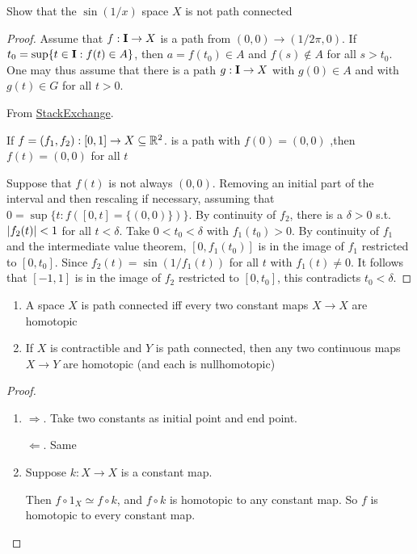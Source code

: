 \documentclass[11pt]{article}
\begin{document}
\begin{exercise}
\label{ex1.15}
Show that the \(\sin(1/x)\) space \(X\) is not path connected
\end{exercise}

\begin{proof}
Assume that \(f:\operatorname{\textbf{I}}\to X\) is a path from \((0,0)\to(1/2\pi,0)\). If \(t_0=\sup\{t\in\operatorname{\textbf{I}}:f(t)\in A\}\),
then \(a=f(t_0)\in A\) and \(f(s)\not\in A\) for all \(s>t_0\). One may thus assume that there is a
path \(g:\operatorname{\textbf{I}}\to X\) with \(g(0)\in A\) and with \(g(t)\in G\) for all \(t>0\).

From \href{https://math.stackexchange.com/questions/35054/topologists-sine-curve-is-not-path-connected}{StackExchange}.

If \(f=(f_1,f_2):[0,1]\to X\subseteq\mathbb{R}^2\).  is a path with \(f(0)=(0,0)\) ,then \(f(t)=(0,0)\) for all \(t\)

Suppose that \(f(t)\) is not always \((0,0)\). Removing an initial part of the interval and then
rescaling if necessary, assuming that \(0=\sup\{t:f([0,t]=\{(0,0)\})\}\). By continuity of \(f_2\),
there is a \(\delta>0\) s.t. \(\abs{f_2(t)}<1\) for all \(t<\delta\). Take \(0<t_0<\delta\) with \(f_1(t_0)>0\).
By continuity of \(f_1\) and the intermediate value theorem, \([0,f_1(t_0)]\) is in the image
of \(f_1\) restricted to \([0,t_0]\). Since \(f_2(t)=\sin(1/f_1(t))\) for all \(t\)
with \(f_1(t)\neq 0\). It follows that \([-1,1]\) is in the image of \(f_2\) restricted
to \([0,t_0]\), this contradicts \(t_0<\delta\).
\end{proof}

\begin{exercise}
\label{ex1.19}
\begin{enumerate}
\item A space \(X\) is path connected iff every two constant maps \(X\to X\) are homotopic
\item If \(X\) is contractible and \(Y\) is path connected, then any two continuous maps \(X\to Y\)
are homotopic (and each is nullhomotopic)
\end{enumerate}
\end{exercise}

\begin{proof}
\begin{enumerate}
\item \(\Rightarrow\). Take two constants as initial point and end point.

\(\Leftarrow\). Same

\item Suppose \(k:X\to X\) is a constant map.
\begin{center}\end{center}
Then \(f\circ 1_X\simeq f\circ k\), and \(f\circ k\) is homotopic to any constant map. So \(f\) is homotopic to
every constant map.
\end{enumerate}
\end{proof}
\end{document}
